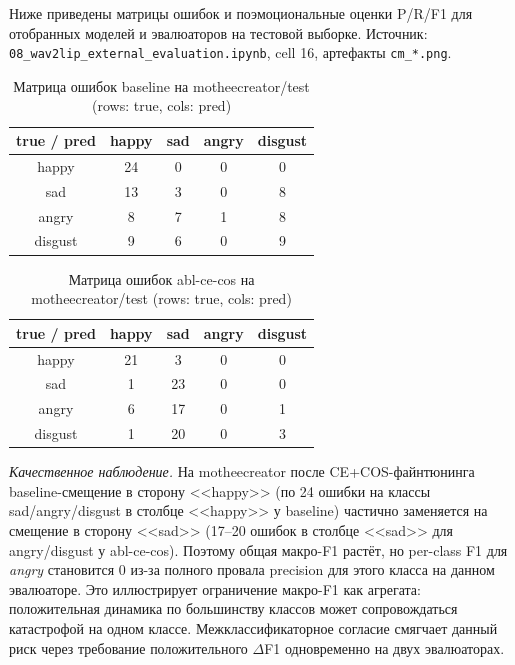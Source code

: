 \documentclass[a4paper, 12pt, oneside, openany]{article}
\begin{document}
Ниже приведены матрицы ошибок и поэмоциональные оценки P/R/F1 для отобранных моделей и эвалюаторов на тестовой выборке. Источник: \texttt{08\_wav2lip\_external\_evaluation.ipynb}, cell 16, артефакты \texttt{cm\_*.png}.

\begin{table}[H]
\caption{Матрица ошибок baseline на motheecreator/test (rows: true, cols: pred)}
\label{tab:cm_baseline_mothee}
\centering
\small
\begin{tabular}{|c|c|c|c|c|}
\hline
true / pred & happy & sad & angry & disgust \\
\hline
happy & 24 & 0 & 0 & 0 \\
\hline
sad & 13 & 3 & 0 & 8 \\
\hline
angry & 8 & 7 & 1 & 8 \\
\hline
disgust & 9 & 6 & 0 & 9 \\
\hline
\end{tabular}
\end{table}

\begin{table}[H]
\caption{Матрица ошибок abl-ce-cos на motheecreator/test (rows: true, cols: pred)}
\label{tab:cm_cecos_mothee}
\centering
\small
\begin{tabular}{|c|c|c|c|c|}
\hline
true / pred & happy & sad & angry & disgust \\
\hline
happy & 21 & 3 & 0 & 0 \\
\hline
sad & 1 & 23 & 0 & 0 \\
\hline
angry & 6 & 17 & 0 & 1 \\
\hline
disgust & 1 & 20 & 0 & 3 \\
\hline
\end{tabular}
\end{table}

\textit{Качественное наблюдение.} На motheecreator после CE+COS-файнтюнинга baseline-смещение в сторону <<happy>> (по 24 ошибки на классы sad/angry/disgust в столбце <<happy>> у baseline) частично заменяется на смещение в сторону <<sad>> (17--20 ошибок в столбце <<sad>> для angry/disgust у abl-ce-cos). Поэтому общая макро-F1 растёт, но per-class F1 для \textit{angry} становится 0 из-за полного провала precision для этого класса на данном эвалюаторе. Это иллюстрирует ограничение макро-F1 как агрегата: положительная динамика по большинству классов может сопровождаться катастрофой на одном классе. Межклассификаторное согласие смягчает данный риск через требование положительного $\Delta$F1 одновременно на двух эвалюаторах.
\end{document}
